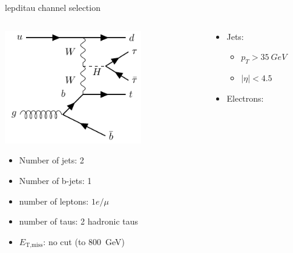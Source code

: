 \begin{frame}{\tHq lepditau channel selection}
  \begin{columns}
    \begin{column}{0.5\textwidth}
      \centering \includegraphics[width=0.7\textwidth]{tHq_tautau}\\
      \begin{itemize}
        \item Number of jets: 2
        \item Number of b-jets: 1
        \item number of leptons: \bf{$1e / \mu$}
        \item number of taus: 2 hadronic taus
        \item $E_{\text{T,miss}}$: no cut (to \SI{800}{GeV})
      \end{itemize}
    \end{column}
    \begin{column}{0.7\textwidth}
      \vspace*{-0.05\textwidth}
      \begin{itemize}
        \item Jets:
        \vspace*{-0.02\textwidth}
        \begin{itemize}
          \item $p_T>\SI{35}{GeV}$
          \item $|\eta|<4.5$
        \end{itemize}
        \item Electrons:
        \vspace*{-0.02\textwidth}
        \begin{itemize}

\end{itemize}
\end{itemize}
\end{column}
\end{columns}
\end{frame}
